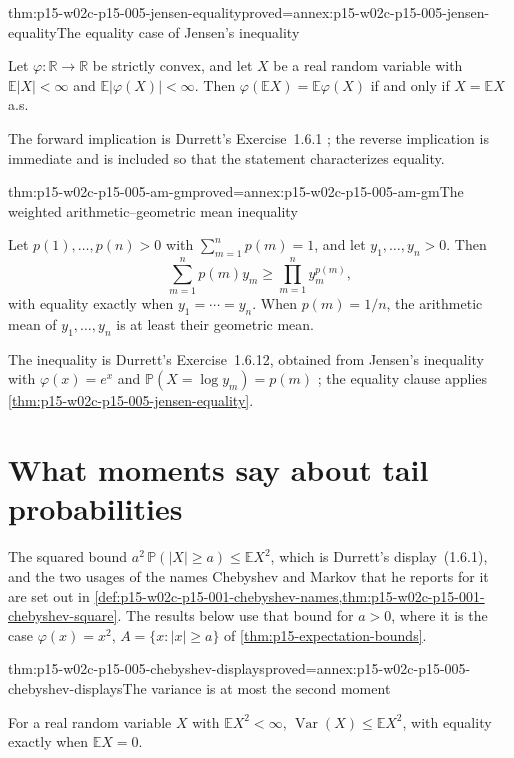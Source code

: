 \begin{hbtheorem}{thm:p15-w02c-p15-005-jensen-equality}{proved=annex:p15-w02c-p15-005-jensen-equality}{The equality case of Jensen's inequality}
\par\nobreak
Let \(\varphi:\mathbb R\to\mathbb R\) be strictly convex, and let
\(X\) be a real random variable with \(\mathbb E|X|<\infty\) and
\(\mathbb E|\varphi(X)|<\infty\). Then
\(\varphi(\mathbb EX)=\mathbb E\varphi(X)\) if and only if
\(X=\mathbb EX\) a.s.
\end{hbtheorem}

The forward implication is Durrett's Exercise~1.6.1
\cite[p.~35]{DurrettPTEAuthor2019}; the reverse implication is
immediate and is included so that the statement characterizes equality.

\begin{hbtheorem}{thm:p15-w02c-p15-005-am-gm}{proved=annex:p15-w02c-p15-005-am-gm}{The weighted arithmetic--geometric mean inequality}
\par\nobreak
Let \(p(1),\ldots,p(n)>0\) with \(\sum_{m=1}^np(m)=1\), and let
\(y_1,\ldots,y_n>0\). Then
\[
 \sum_{m=1}^np(m)y_m\geq\prod_{m=1}^ny_m^{p(m)},
\]
with equality exactly when \(y_1=\cdots=y_n\). When \(p(m)=1/n\),
the arithmetic mean of \(y_1,\ldots,y_n\) is at least their geometric
mean.
\end{hbtheorem}

The inequality is Durrett's Exercise~1.6.12, obtained from Jensen's
inequality with \(\varphi(x)=e^x\) and
\(\mathbb P(X=\log y_m)=p(m)\) \cite[p.~37]{DurrettPTEAuthor2019};
the equality clause applies \cref{thm:p15-w02c-p15-005-jensen-equality}.

\section{What moments say about tail probabilities}
\label{sec:p15-w02c-p15-005-moment-bounds}

The squared bound \(a^2\,\mathbb P(|X|\geq a)\leq\mathbb EX^2\), which
is Durrett's display~(1.6.1), and the two usages of the names Chebyshev
and Markov that he reports for it are set out in
\cref{def:p15-w02c-p15-001-chebyshev-names,thm:p15-w02c-p15-001-chebyshev-square}.
The results below use that bound for \(a>0\), where it is the case
\(\varphi(x)=x^2\), \(A=\{x:|x|\geq a\}\) of
\cref{thm:p15-expectation-bounds}.

\begin{hbcorollary}{thm:p15-w02c-p15-005-chebyshev-displays}{proved=annex:p15-w02c-p15-005-chebyshev-displays}{The variance is at most the second moment}
\par\nobreak
For a real random variable \(X\) with \(\mathbb EX^2<\infty\),
\(\operatorname{Var}(X)\leq\mathbb EX^2\), with equality exactly when
\(\mathbb EX=0\).
\end{hbcorollary}

